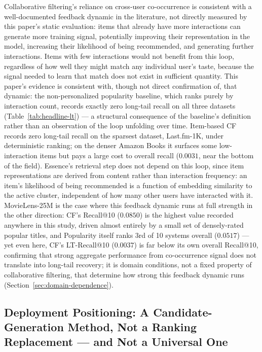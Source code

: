 \documentclass[11pt,a4paper]{article}
\begin{document}
Collaborative filtering's reliance on cross-user co-occurrence is
consistent with a well-documented feedback dynamic in the literature, not
directly measured by this paper's static evaluation: items that already
have more interactions can generate more training signal, potentially
improving their representation in the model, increasing their likelihood
of being recommended, and generating further interactions. Items with few
interactions would not benefit from this loop, regardless of how well they
might match any individual user's taste, because the signal needed to learn
that match does not exist in sufficient quantity. This paper's evidence is
consistent with, though not direct confirmation of, that dynamic: the
non-personalized popularity baseline, which ranks purely by interaction
count, records exactly zero long-tail recall on all three datasets
(Table~\ref{tab:headline-lt}) --- a structural consequence of the
baseline's definition rather than an observation of the loop unfolding
over time. Item-based CF records zero long-tail recall
on the sparsest dataset, Last.fm-1K, under deterministic ranking; on the
denser Amazon Books it surfaces some low-interaction items but pays a
large cost to overall recall ($0.0031$, near the bottom of the field).
Essence's retrieval step does not depend on this
loop, since item representations are derived from content rather than
interaction frequency: an item's likelihood of being recommended is a
function of embedding similarity to the active cluster, independent of how
many other users have interacted with it. MovieLens-25M is the case where
this feedback dynamic runs at full strength in the other direction: CF's Recall@10
($0.0850$) is the highest value recorded anywhere in this study, driven
almost entirely by a small set of densely-rated popular titles, and
Popularity itself ranks 3rd of 10 systems overall ($0.0517$) --- yet even
here, CF's LT-Recall@10 ($0.0037$) is far below its own overall Recall@10,
confirming that strong aggregate
performance from co-occurrence signal does not translate into long-tail
recovery; it is domain conditions, not a fixed property of collaborative
filtering, that determine how strong this feedback dynamic runs (Section~\ref{sec:domain-dependence}).

\subsection{Deployment Positioning: A Candidate-Generation Method, Not a
Ranking Replacement --- and Not a Universal One}
\end{document}
